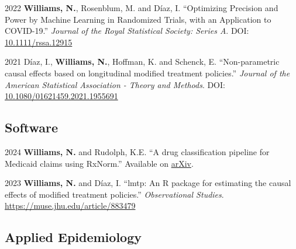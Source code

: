 \documentclass[12pt,letterpaper]{report}
\begin{document}
\begin{tablist}
        \item[2022] \tab \textbf{Williams, N.}, Rosenblum, M. and Díaz, I. \enquote {Optimizing Precision and Power by Machine Learning in Randomized Trials, with an Application to COVID-19.} \textit{Journal of the Royal Statistical Society: Series A}. DOI: \href{https://doi.org/10.1111/rssa.12915}{10.1111/rssa.12915}
    
       \item[2021] \tab Díaz, I., \textbf{Williams, N.}, Hoffman, K. and Schenck, E. \enquote{Non-parametric causal effects based on longitudinal modified treatment policies.} \textit{Journal of the American Statistical Association - Theory and Methods}. DOI: \href{https://doi.org/10.1080/01621459.2021.1955691}{10.1080/01621459.2021.1955691}
       
    \end{tablist}
    
    \subsection*{Software}
    
    \begin{tablist}
    
    	\item[2024] \tab \textbf{Williams, N.} and Rudolph, K.E. \enquote{A drug classification pipeline for Medicaid claims using RxNorm.} Available on \href{https://arxiv.org/abs/2404.01514}{arXiv}.
    
        \item[2023] \tab \textbf{Williams, N.} and Díaz, I. \enquote{lmtp: An R package for estimating the causal effects of modified treatment policies.} \textit{Observational Studies}. \url{https://muse.jhu.edu/article/883479}
    
    \end{tablist}

    \subsection*{Applied Epidemiology}
\end{document}
